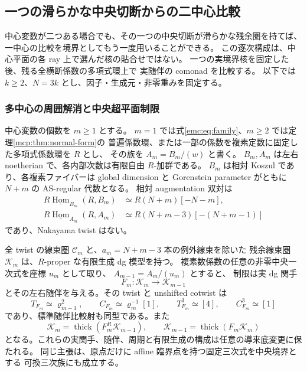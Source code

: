 \subsection{一つの滑らかな中央切断からの二中心比較}
\label{mci:subsec:iterated-comparison}

中心変数が二つある場合でも、その一つの中央切断が滑らかな残余圏を持てば、
一中心の比較を境界としてもう一度用いることができる。
この逐次構成は、中心平面の各 ray 上で選んだ核の貼合せではない。
一つの実境界核を固定した後、残る全横断係数の多項式環上で
実随伴の comonad を比較する。
以下では $k\ge2$、$N=3k$ とし、因子・生成元・非零重みを固定する。

\subsubsection{多中心の周囲解消と中央超平面制限}

\begin{proposition}[共有中心差を用いる相対線束模型]
\label{mci:prop:ambient-line-model}
中心変数の個数を $m\ge1$ とする。
$m=1$ では式\eqref{emc:eq:family}、$m\ge2$ では定理\ref{mcp:thm:normal-form}の
普遍係数環、または一部の係数を複素定数に固定した多項式係数環を $R$ とし、
その族を $A_m=B_m/(w)$ と書く。
$B_m,A_m$ は左右 noetherian で、各内部次数は有限自由 $R$-加群である。
$B_m$ は相対 Koszul であり、各複素ファイバーは
global dimension と Gorenstein parameter がともに $N+m$ の AS-regular 代数となる。
相対 augmentation 双対は
\begin{equation}\label{mci:eq:augmentation-duals}
 \begin{split}
 R\underline{\operatorname{Hom}}_{B_m}(R,B_m)
     &\simeq R(N+m)[-N-m],\\
 R\underline{\operatorname{Hom}}_{A_m}(R,A_m)
     &\simeq R(N+m-3)[-(N+m-1)]
 \end{split}
\end{equation}
であり、Nakayama twist はない。

全 twist の線束圏 $\mathcal C_m$ と、$a_m=N+m-3$ 本の例外線束を除いた
残余線束圏 $\mathcal K_m$ は、$R$-proper な有限生成 dg 模型を持つ。
複素数係数の任意の非零中央一次式を座標 $u_m$ として取り、
$A_{m-1}=A_m/(u_m)$ とすると、
制限は実 dg 関手
\[
 F_m:\mathcal K_m\longrightarrow\mathcal K_{m-1}
\]
とその左右随伴を与える。その twist と unshifted cotwist は
\begin{equation}\label{mci:eq:spherical-periods}
 T_{F_m}\simeq\varrho_{m-1}^2,\qquad
 C_{F_m}\simeq\varrho_m^{-1}[1],\qquad
 T_{F_m}^3\simeq[4],\qquad C_{F_m}^3\simeq[1]
\end{equation}
であり、標準随伴比較射も同型である。また
\begin{equation}\label{mci:eq:generation}
 \mathcal K_m=\operatorname{thick}(F_m^R\mathcal K_{m-1}),\qquad
 \mathcal K_{m-1}=\operatorname{thick}(F_m\mathcal K_m)
\end{equation}
となる。これらの実関手、随伴、周期と有限生成の構成は任意の導来底変更に保たれる。
同じ主張は、原点だけに affine 臨界点を持つ固定三次式を中央境界とする
可換三次族にも成立する。
\end{proposition}

